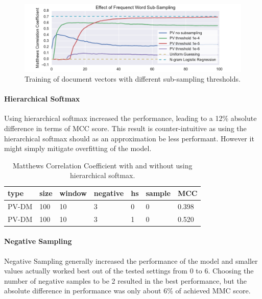 \begin{figure}[h]
    \centering
    \includegraphics[width=\textwidth]{img/exp-vector-space-doc2vec-param-sample.pdf}
    \caption{Training of document vectors with different sub-sampling thresholds.}
  \label{fig:exp-vector-space-doc2vec-param-sample}
\end{figure}

\paragraph{Hierarchical Softmax}
Using hierarchical softmax increased the performance, leading to a 12\% absolute difference in terms of MCC score. This result is counter-intuitive as using the hierarchical softmax should as an approximation be less performant. However it might simply mitigate overfitting of the model.

\begin{table}[h]
  \begin{center}
  \begin{tabular}{ *6l | l }
    \toprule
    type & size & window & negative & hs & sample & MCC  \\
    \midrule
    PV-DM & 100 & 10 & 3 & 0 & 0 & 0.398 \\
    PV-DM & 100 & 10 & 3 & 1 & 0 & 0.520 \\
    \bottomrule
  \end{tabular}
  \caption{Matthews Correlation Coefficient with and without using hierarchical softmax.}
\label{tab:Paragraph Vector Parameter Results Hierarchical Softmax}
\end{center}
\end{table}

\paragraph{Negative Sampling}
Negative Sampling generally increased the performance of the model and smaller values actually worked best out of the tested settings from 0 to 6. Choosing the number of negative samples to be 2 resulted in the best performance, but the absolute difference in performance was only about 6\% of achieved MMC score.

